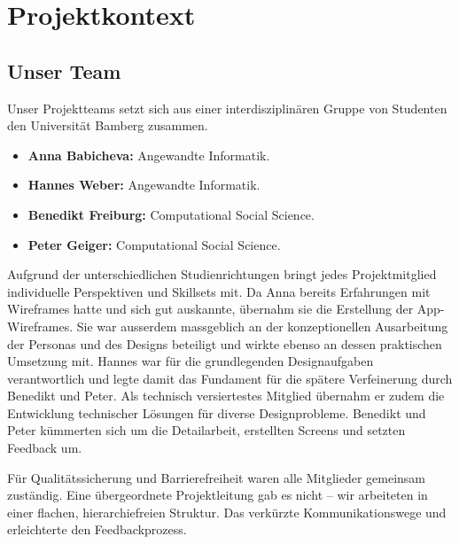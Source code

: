 \section{Projektkontext}
\subsection{Unser Team}
Unser Projektteams setzt sich aus einer interdisziplinären Gruppe von Studenten den Universität Bamberg zusammen.

\begin{itemize}
	\item \textbf{Anna Babicheva:} Angewandte Informatik.
	\item \textbf{Hannes Weber:} Angewandte Informatik.
	\item \textbf{Benedikt Freiburg:} Computational Social Science.
	\item \textbf{Peter Geiger:} Computational Social Science.
\end{itemize}

Aufgrund der unterschiedlichen Studienrichtungen bringt jedes Projektmitglied individuelle Perspektiven und Skillsets mit. Da Anna bereits Erfahrungen mit Wireframes hatte und sich gut auskannte, übernahm sie die Erstellung der App-Wireframes. Sie war ausserdem massgeblich an der konzeptionellen Ausarbeitung der Personas und des Designs beteiligt und wirkte ebenso an dessen praktischen Umsetzung mit. Hannes war für die grundlegenden Designaufgaben verantwortlich und legte damit das Fundament für die spätere Verfeinerung durch Benedikt und Peter. Als technisch versiertestes Mitglied übernahm er zudem die Entwicklung technischer Lösungen für diverse Designprobleme. Benedikt und Peter kümmerten sich um die Detailarbeit, erstellten Screens und setzten Feedback um.

Für Qualitätssicherung und Barrierefreiheit waren alle Mitglieder gemeinsam zuständig. Eine übergeordnete Projektleitung gab es nicht – wir arbeiteten in einer flachen, hierarchiefreien Struktur. Das verkürzte Kommunikationswege und erleichterte den Feedbackprozess.

\newpage

